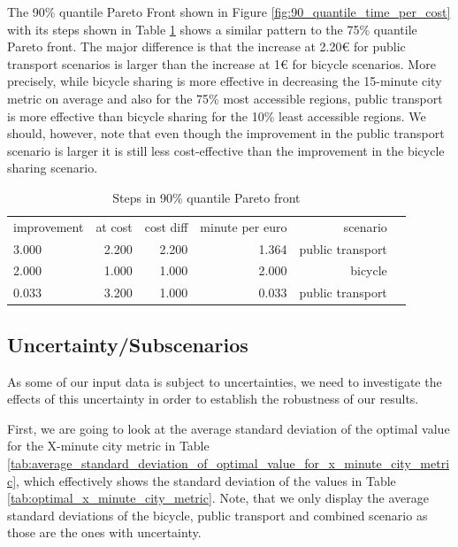 The 90\% quantile Pareto Front shown in Figure \ref{fig:90_quantile_time_per_cost} with its steps shown in Table \ref{tab:differences_in_90_quantile_pareto_front} shows a similar pattern to the 75\% quantile Pareto front.
The major difference is that the increase at 2.20€ for public transport scenarios is larger than the increase at 1€ for bicycle scenarios.
More precisely, while bicycle sharing is more effective in decreasing the 15-minute city metric on average and also for the 75\% most accessible regions, public transport is more effective than bicycle sharing for the 10\% least accessible regions.
We should, however, note that even though the improvement in the public transport scenario is larger it is still less cost-effective than the improvement in the bicycle sharing scenario.


\begin{table}
  \caption{Steps in 90\% quantile Pareto front}
  \label{tab:differences_in_90_quantile_pareto_front}
  \begin{center}
    \begin{tabular}{lrrrrl}
     improvement & at cost & cost diff & minute per euro & scenario \\
     3.000 & 2.200 & 2.200 & 1.364 & public transport \\
     2.000 & 1.000 & 1.000 & 2.000 & bicycle \\
     0.033 & 3.200 & 1.000 & 0.033 & public transport \\
    \end{tabular}
  \end{center}
\end{table}


\subsection{Uncertainty/Subscenarios}
\label{subsec:uncertainty_subscenarios}

As some of our input data is subject to uncertainties, we need to investigate the effects of this uncertainty in order to establish the robustness of our results.

First, we are going to look at the average standard deviation of the optimal value for the X-minute city metric in Table \ref{tab:average_standard_deviation_of_optimal_value_for_x_minute_city_metric}, which effectively shows the standard deviation of the values in Table \ref{tab:optimal_x_minute_city_metric}.
Note, that we only display the average standard deviations of the bicycle, public transport and combined scenario as those are the ones with uncertainty.

